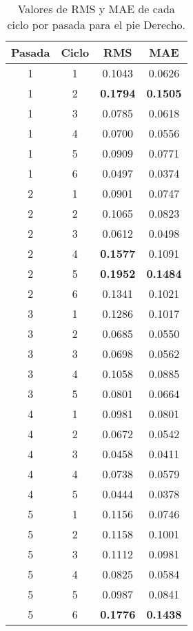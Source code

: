 \begin{table}[H]
\centering
\renewcommand{\arraystretch}{1.2}
\begin{tabular}{|c|c|c|c|}
\hline
\textbf{Pasada} & \textbf{Ciclo} & \textbf{RMS} & \textbf{MAE} \\
\hline
1 & 1 & 0.1043 & 0.0626 \\
\hline
1 & 2 & \textbf{0.1794} & \textbf{0.1505} \\
\hline
1 & 3 & 0.0785 & 0.0618 \\
\hline
1 & 4 & 0.0700 & 0.0556 \\
\hline
1 & 5 & 0.0909 & 0.0771 \\
\hline
1 & 6 & 0.0497 & 0.0374 \\
\hline
2 & 1 & 0.0901 & 0.0747 \\
\hline
2 & 2 & 0.1065 & 0.0823 \\
\hline
2 & 3 & 0.0612 & 0.0498 \\
\hline
2 & 4 & \textbf{0.1577} & 0.1091 \\
\hline
2 & 5 & \textbf{0.1952} & \textbf{0.1484} \\
\hline
2 & 6 & 0.1341 & 0.1021 \\
\hline
3 & 1 & 0.1286 & 0.1017 \\
\hline
3 & 2 & 0.0685 & 0.0550 \\
\hline
3 & 3 & 0.0698 & 0.0562 \\
\hline
3 & 4 & 0.1058 & 0.0885 \\
\hline
3 & 5 & 0.0801 & 0.0664 \\
\hline
4 & 1 & 0.0981 & 0.0801 \\
\hline
4 & 2 & 0.0672 & 0.0542 \\
\hline
4 & 3 & 0.0458 & 0.0411 \\
\hline
4 & 4 & 0.0738 & 0.0579 \\
\hline
4 & 5 & 0.0444 & 0.0378 \\
\hline
5 & 1 & 0.1156 & 0.0746 \\
\hline
5 & 2 & 0.1158 & 0.1001 \\
\hline
5 & 3 & 0.1112 & 0.0981 \\
\hline
5 & 4 & 0.0825 & 0.0584 \\
\hline
5 & 5 & 0.0987 & 0.0841 \\
\hline
5 & 6 & \textbf{0.1776} & \textbf{0.1438} \\
\hline
\end{tabular}
\caption{Valores de RMS y MAE de cada ciclo por pasada para el pie Derecho.}
\label{tab:rms_mae_pie_derecho}
\end{table}
